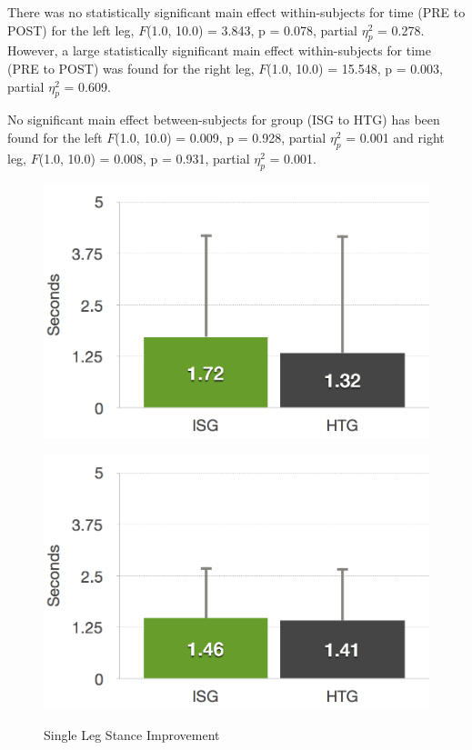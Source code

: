 There was no statistically significant main effect within-subjects for time (PRE to POST) for the left leg, $F$(1.0, 10.0) = 3.843, p = 0.078, partial $\eta_{p}^{2}$ = 0.278.
However, a large statistically significant main effect within-subjects for time (PRE to POST) was found for the right leg, $F$(1.0, 10.0) = 15.548, p = 0.003, partial $\eta_{p}^{2}$ = 0.609.

No significant main effect between-subjects for group (ISG to HTG) has been found for the left $F$(1.0, 10.0) = 0.009, p = 0.928, partial $\eta_{p}^{2}$ = 0.001 and right leg, $F$(1.0, 10.0) = 0.008, p = 0.931, partial $\eta_{p}^{2}$ = 0.001.
\begin{figure}[htb]
	\centering
	\begin{minipage}[t]{0.49\linewidth}
		\centering
		\includegraphics[width=1\linewidth]{Pictures/6_4_DIA_StandLeftDiff}
		\label{fig:6_4_standLeftImprovement}
	\end{minipage}
	\hfill
	\begin{minipage}[t]{0.49\linewidth}
		\centering
		\includegraphics[width=1\linewidth]{Pictures/6_4_DIA_StandRightDiff}
		\label{fig:6_4_standRightImprovement}
	\end{minipage}
	\caption{Single Leg Stance Improvement}
	\label{fig:6_4_standImprovement}
\end{figure}


